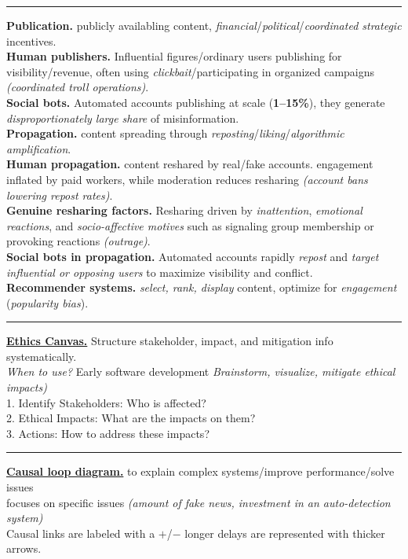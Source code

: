 \documentclass[8pt, a4paper]{extarticle}
\makeatletter
\renewcommand{\hline}{\noalign{\vskip 2px}\hrule\@height\arrayrulewidth\@width\linewidth\noalign{\vskip 2px}}
\makeatother
\begin{document}
\begin{minipage}[t]{0.48\textwidth}
{\begin{minipage}[t]{1\textwidth}
			\hline
			\textbf{Publication.} publicly availabling content, \textit{financial}/\textit{political}/\textit{coordinated strategic} incentives.\\
			\textbf{Human publishers.} Influential figures/ordinary users publishing for visibility/revenue, often using \textit{clickbait}/participating in organized campaigns \textit{(coordinated troll operations)}.\\
			\textbf{Social bots.} Automated accounts publishing at scale (\textbf{1--15\%}), they generate \textit{disproportionately large share} of misinformation.\\
			\textbf{Propagation.} content spreading through \textit{reposting}/\textit{liking}/\textit{algorithmic amplification}.\\
			\textbf{Human propagation.} content reshared by real/fake accounts. engagement inflated by paid workers, while moderation reduces resharing \textit{(account bans lowering repost rates)}.\\
			\textbf{Genuine resharing factors.} Resharing driven by \textit{inattention}, \textit{emotional reactions}, and \textit{socio-affective motives} such as signaling group membership or provoking reactions \textit{(outrage)}.\\
			\textbf{Social bots in propagation.} Automated accounts rapidly \textit{repost} and \textit{target influential or opposing users} to maximize visibility and conflict.\\
			\textbf{Recommender systems.} \textit{select, rank, display} content, optimize for \textit{engagement} (\textit{popularity bias}).
			\hline
			\begin{minipage}[t]{0.49\textwidth}
				\ul{\textbf{Ethics Canvas.}} Structure stakeholder, impact, and mitigation info systematically. \\
				\textit{When to use?} Early software development \textit{Brainstorm, visualize, mitigate ethical impacts)}\\
				1. Identify Stakeholders: Who is affected?\\
				2. Ethical Impacts: What are the impacts on them?\\
				3. Actions: How to address these impacts?\hline
				\ul{\textbf{Causal loop diagram.}} to explain complex systems/improve performance/solve issues\\
				focuses on specific issues \textit{(amount of fake news, investment in an auto-detection system)}\\
				Causal links are labeled with a $+$/$-$ longer delays are represented with thicker arrows.

\end{minipage}
\end{minipage}}
\end{minipage}
\end{document}
